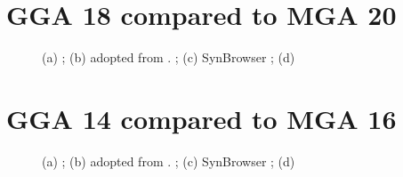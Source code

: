 \documentclass[a4paper,9pt]{extarticle}
\begin{document}
\section{GGA 18 compared to MGA 20}
\begin{figure}[!h]
  \centering
  \caption{
  (a)
  ;
  (b)
  adopted from \cite{}.
  ;
  (c)
  SynBrowser
  ;
  (d)
  }
\end{figure}

\clearpage
\section{GGA 14 compared to MGA 16}
\begin{figure}[!h]
  \centering
  \caption{
  (a)
  ;
  (b)
  adopted from \cite{}.
  ;
  (c)
  SynBrowser
  ;
  (d)
  }
\end{figure}
\end{document}
